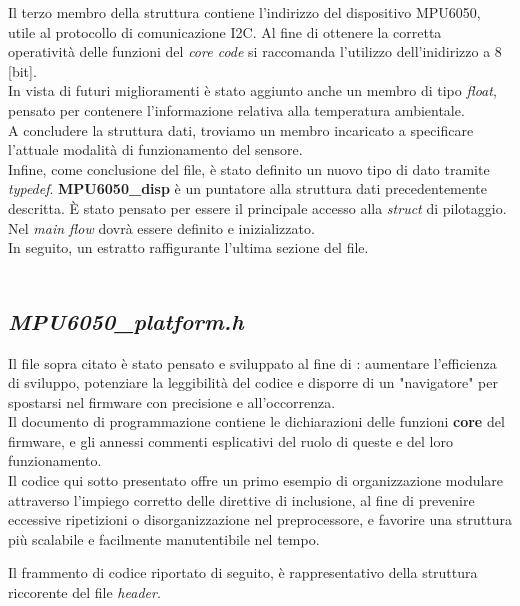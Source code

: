 \documentclass[11pt]{report}
\begin{document}
Il terzo membro della struttura contiene l'indirizzo del dispositivo MPU6050, utile al protocollo di comunicazione I2C. Al fine di ottenere la corretta operatività delle funzioni del \textit{core code} si raccomanda l'utilizzo dell'inidirizzo a 8 [bit].\\
In vista di futuri miglioramenti è stato aggiunto anche un membro di tipo \textit{float}, pensato per contenere l'informazione relativa alla temperatura ambientale.\\
A concludere la struttura dati, troviamo un membro incaricato a specificare l'attuale modalità di funzionamento del sensore.\\
Infine, come conclusione del file, è stato definito un nuovo tipo di dato tramite \textit{typedef}. \textbf{MPU6050\_disp} è un puntatore alla struttura dati precedentemente descritta. È stato pensato per essere il principale accesso alla \textit{struct} di pilotaggio. Nel \textit{main flow} dovrà essere definito e inizializzato.\\
In seguito, un estratto raffigurante l'ultima sezione del file.\\\\

\subsection{\textit{MPU6050\_platform.h}}
Il file sopra citato è stato pensato e sviluppato al fine di : aumentare l'efficienza di sviluppo, potenziare la leggibilità del codice e disporre di un "navigatore" per spostarsi nel firmware con precisione e all'occorrenza.\\
Il documento di programmazione contiene le dichiarazioni delle funzioni \textbf{core} del firmware, e gli annessi commenti esplicativi del ruolo di queste e del loro funzionamento.\\
Il codice qui sotto presentato offre un primo esempio di organizzazione modulare attraverso l'impiego corretto delle direttive di inclusione, al fine di prevenire eccessive ripetizioni o disorganizzazione nel preprocessore, e favorire una struttura più scalabile e facilmente manutentibile nel tempo.

Il frammento di codice riportato di seguito, è rappresentativo della struttura riccorente del file \textit{header}.
\end{document}
